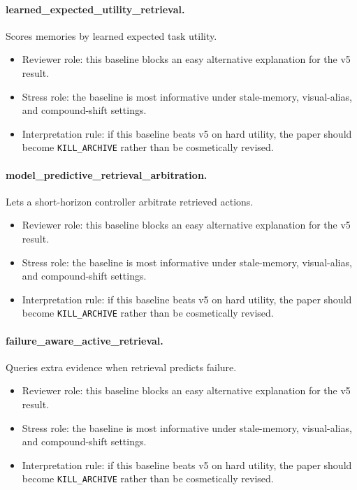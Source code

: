\documentclass{article}
\begin{document}
\paragraph{learned\_expected\_utility\_retrieval.} Scores memories by learned expected task utility.
\begin{itemize}
\item Reviewer role: this baseline blocks an easy alternative explanation for the v5 result.
\item Stress role: the baseline is most informative under stale-memory, visual-alias, and compound-shift settings.
\item Interpretation rule: if this baseline beats v5 on hard utility, the paper should become \texttt{KILL\_ARCHIVE} rather than be cosmetically revised.
\end{itemize}
\paragraph{model\_predictive\_retrieval\_arbitration.} Lets a short-horizon controller arbitrate retrieved actions.
\begin{itemize}
\item Reviewer role: this baseline blocks an easy alternative explanation for the v5 result.
\item Stress role: the baseline is most informative under stale-memory, visual-alias, and compound-shift settings.
\item Interpretation rule: if this baseline beats v5 on hard utility, the paper should become \texttt{KILL\_ARCHIVE} rather than be cosmetically revised.
\end{itemize}
\paragraph{failure\_aware\_active\_retrieval.} Queries extra evidence when retrieval predicts failure.
\begin{itemize}
\item Reviewer role: this baseline blocks an easy alternative explanation for the v5 result.
\item Stress role: the baseline is most informative under stale-memory, visual-alias, and compound-shift settings.
\item Interpretation rule: if this baseline beats v5 on hard utility, the paper should become \texttt{KILL\_ARCHIVE} rather than be cosmetically revised.
\end{itemize}
\end{document}
